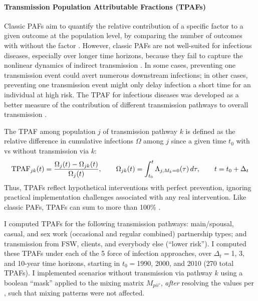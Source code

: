 \paragraph{Transmission Population Attributable Fractions (TPAFs)}
Classic PAFs aim to quantify
the relative contribution of a specific factor to a given outcome at the population level,
by comparing the number of outcomes with \vs without the factor \cite{Rockhill2011,Poole2015}.
However, classic PAFs are not well-suited for infectious diseases,
especially over longer time horizons, because
they fail to capture the nonlinear dynamics of indirect transmission \cite{Mishra2020}.
In some cases, preventing one transmission event could avert numerous downstream infections;
in other cases, preventing one transmission event might only
delay infection a short time for an individual at high risk.
The TPAF for infectious diseases was developed as a better measure of the contribution of
different transmission pathways to overall transmission \cite{Deering2008,Mishra2014,Mishra2016}.
\par
The TPAF among population $j$ of transmission pathway $k$ is defined as
the relative difference in cumulative infections $\Omega$ among $j$ since a given time $t_0$
with vs without transmission via $k$:
\begin{equation}\label{eq:tpaf}
  \textup{TPAF}_{jk}(t) = \frac{\Omega_{j}(t) - \Omega_{jk} (t)}{\Omega_{j}(t)}
  ,\qquad
  \Omega_{jk}(t) = \int_{t_0}^{t} \Lambda_{j,M_k=0}(\tau)\,d\tau
  ,\qquad
  t = t_0 + \Delta_t
\end{equation}
Thus, TPAFs reflect hypothetical interventions with perfect prevention,
ignoring practical implementation challenges associated with any real intervention.
Like classic PAFs, TPAFs can sum to more than 100\% \cite{Rowe2004,Mishra2021}.
\par
I computed TPAFs for the following transmission pathways:
main/spousal, casual, and sex work (occasional and regular combined) partnership types; and
transmission from FSW, clients, and everybody else (``lower risk'').
I computed these TPAFs under each of the 5 force of infection approaches,
over $\Delta_t = {}$1, 3, and 10-year time horizons,
starting in $t_0 = {}$1990, 2000, and 2010 (270 total TPAFs).
I implemented scenarios without transmission via pathway $k$
using a boolean ``mask'' applied to the mixing matrix $M_{pii'}$,
\emph{after} resolving the values per ,
such that mixing patterns were not affected.
